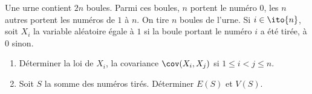 \begin{enonce}
\begin{exercise}[ID={RMS127 E1144},subtitle={Centrale PC 2016},tags={}, difficulty={0}]
Une urne contient $2n$ boules.
Parmi ces boules, $n$ portent le numéro $0$, les $n$ autres portent les numéros de $1$ à $n$.
On tire $n$ boules de l'urne.
  Si $i\in\ito{n}$, soit $X_i$ la variable aléatoire égale à $1$ si la boule portant le numéro $i$ a été tirée, à $0$ sinon.
  \begin{enumerate}
    \item Déterminer la loi de $X_i$, la covariance $\cov(X_i, X_j)$ si $1\leq i<j\leq n$.

    \item Soit $S$ la somme des numéros tirés.
      Déterminer $E(S)$ et $V(S)$.
  \end{enumerate}
\end{exercise}
\begin{solution}
\end{solution}
\end{enonce}
